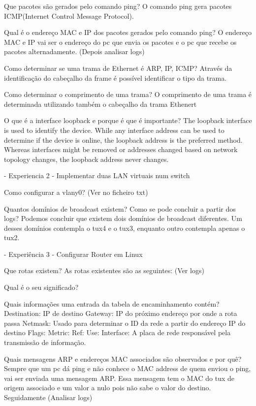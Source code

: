 \documentclass[article, a4paper, 11pt, oneside]{memoir}
\begin{document}
Que pacotes são gerados pelo comando ping?
  O comando ping gera pacotes ICMP(Internet Control Message Protocol).

Qual é o endereço MAC e IP dos pacotes gerados pelo comando ping?
O endereço MAC e IP vai ser o endereço do pc que envia os pacotes e o pc que recebe os pacotes alternadamente.
(Depois analisar logs)

Como determinar se uma trama de Ethernet é ARP, IP, ICMP?
Através da identificação do cabeçalho da frame é possível identificar o tipo da trama.

Como determinar o comprimento de uma trama?
O comprimento de uma trama é determinada utilizando também o cabeçalho da trama Ethenert

O que é a interface loopback e porque é que é importante?
The loopback interface is used to identify the device. 
While any interface address can be used to determine if the device is online, 
the loopback address is the preferred method. 
Whereas interfaces might be removed or addresses changed based on network topology changes, 
the loopback address never changes.

- Experiencia 2 - Implementar duas LAN virtuais num switch

Como configurar a vlany0?
(Ver no ficheiro txt)

Quantos domínios de broadcast existem? Como se pode concluir a partir dos logs?
Podemos concluir que existem dois domínios de broadcast diferentes.
Um desses domínios contempla o tux4 e o tux3, enquanto outro contempla apenas o tux2.


- Experiência 3 - Configurar Router em Linux

Que rotas existem?
As rotas existentes são as seguintes:
(Ver logs)

Qual é o seu significado?

Quais informações uma entrada da tabela de encaminhamento contém?
Destination: IP de destino
Gateway: IP do próximo endereço por onde a rota passa
Netmask: Usado para determinar o ID da rede a partir do endereço IP do destino
Flags:
Metric:
Ref:
Use:
Interface: A placa de rede responsável pela transmissão de informação.

Quais mensagens ARP e endereços MAC associados são observados e por quê?
Sempre que um pc dá ping e não conhece o MAC address de quem enviou o ping, vai ser enviada uma mensagem ARP.
Essa mensagem tem o MAC do tux de origem associado e um valor a nulo pois não sabe o valor do destino.
Seguidamente
(Analisar logs)
\end{document}
